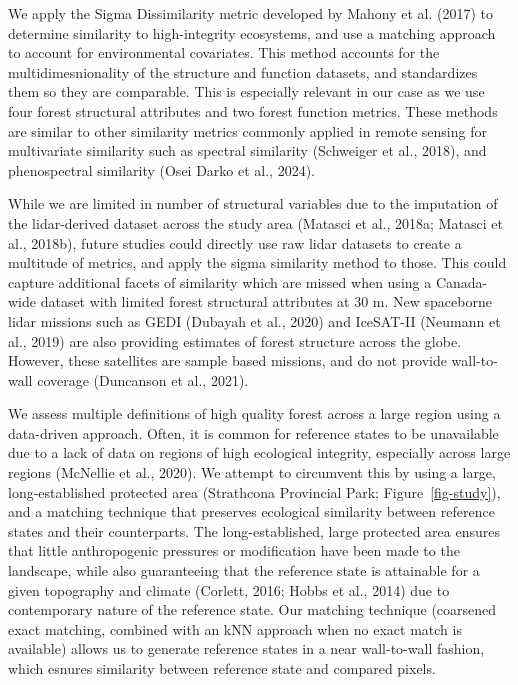 \documentclass[
]{agujournal2019}
\begin{document}
We apply the Sigma Dissimilarity metric developed by Mahony et al.
(2017) to determine similarity to high-integrity ecosystems, and use a
matching approach to account for environmental covariates. This method
accounts for the multidimesnionality of the structure and function
datasets, and standardizes them so they are comparable. This is
especially relevant in our case as we use four forest structural
attributes and two forest function metrics. These methods are similar to
other similarity metrics commonly applied in remote sensing for
multivariate similarity such as spectral similarity (Schweiger et al.,
2018), and phenospectral similarity (Osei Darko et al., 2024).

While we are limited in number of structural variables due to the
imputation of the lidar-derived dataset across the study area (Matasci
et al., 2018a; Matasci et al., 2018b), future studies could directly use
raw lidar datasets to create a multitude of metrics, and apply the sigma
similarity method to those. This could capture additional facets of
similarity which are missed when using a Canada-wide dataset with
limited forest structural attributes at 30 m. New spaceborne lidar
missions such as GEDI (Dubayah et al., 2020) and IceSAT-II (Neumann et
al., 2019) are also providing estimates of forest structure across the
globe. However, these satellites are sample based missions, and do not
provide wall-to-wall coverage (Duncanson et al., 2021).

We assess multiple definitions of high quality forest across a large
region using a data-driven approach. Often, it is common for reference
states to be unavailable due to a lack of data on regions of high
ecological integrity, especially across large regions (McNellie et al.,
2020). We attempt to circumvent this by using a large, long-established
protected area (Strathcona Provincial Park; Figure~\ref{fig-study}), and
a matching technique that preserves ecological similarity between
reference states and their counterparts. The long-established, large
protected area ensures that little anthropogenic pressures or
modification have been made to the landscape, while also guaranteeing
that the reference state is attainable for a given topography and
climate (Corlett, 2016; Hobbs et al., 2014) due to contemporary nature
of the reference state. Our matching technique (coarsened exact
matching, combined with an kNN approach when no exact match is
available) allows us to generate reference states in a near wall-to-wall
fashion, which esnures similarity between reference state and compared
pixels.
\end{document}
